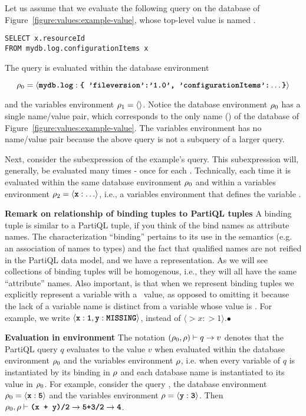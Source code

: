 \begin{example}
Let us assume that we evaluate the following query on the database of
Figure~\ref{figure:values:example-value}, whose top-level value is named
.

\begin{lstlisting}
SELECT x.resourceId
FROM mydb.log.configurationItems x
\end{lstlisting}

The query is evaluated within the database environment 

\[\rho_{0} = \langle \texttt{\textbf{mydb.log}}:\texttt{\textbf{\{ 'fileversion':'1.0', 'configurationItems':}}\ldots \texttt{\textbf{\}}} \rangle \]

\noindent and the variables environment $\rho_1 = \langle \rangle$. Notice the
database environment $\rho_{0}$ has a single name/value pair, which corresponds to
the only name () of the database of
Figure~\ref{figure:values:example-value}. The variables environment has no
name/value pair because the above query is not a subquery of a larger query. 

Next, consider the subexpression  of the example's query. This
subexpression will, generally, be evaluated many times - once for each .
Technically, each time it is evaluated within the same database environment
$\rho_{0}$ and within a variables environment $\rho_2 = \langle \texttt{\textbf{x}}:\ldots
\rangle$, i.e., a variables environment that defines the variable . 
\end{example}

\noindent \textbf{Remark on relationship of binding tuples to PartiQL tuples}
A binding tuple is similar to a PartiQL tuple, if you think of the bind names as
attribute names. The characterization ``binding'' pertains to its use in the
semantics (e.g. an association of names to types) and the fact that qualified
names are not reified in the PartiQL data model, and we have a representation.
As we will see collections of binding tuples will be homogenous, i.e., they will
all have the same ``attribute'' names. Also important, is that when we represent
binding tuples we explicitly represent a variable with a \MISSING\
value, as opposed to omitting it because the lack of a variable name is distinct
from a variable whose value is \MISSING. For example, we write $\langle
\texttt{\textbf{x}}:\texttt{\textbf{1}}, \texttt{\textbf{y}}:\texttt{\textbf{MISSING}} \rangle$, instead of $\langle \gt{x}:\gt{1}
\rangle$.$\bullet$

\noindent \textbf{Evaluation in environment} The notation $(\rho_{0}, \rho) \vdash q
\rightarrow v$ denotes that the PartiQL query $q$ evaluates to the value $v$
when evaluated within the database environment $\rho_{0}$ and the variables
environment $\rho$, i.e. when every variable of $q$ is instantiated by its
binding in $\rho$ and each database name is instantiated to its value in $\rho_{0}$.
For example, consider the query \gt{x + y / 2}, the database environment $\rho_{0} =
\langle \texttt{\textbf{x}}:\texttt{\textbf{5}} \rangle$ and the variables environment $\rho = \langle
\texttt{\textbf{y}}:\texttt{\textbf{3}} \rangle$. Then $\rho_{0}, \rho \vdash \texttt{\textbf{(x + y)/2}} \rightarrow
\texttt{\textbf{5+3/2}} \rightarrow \texttt{\textbf{4}}$.

